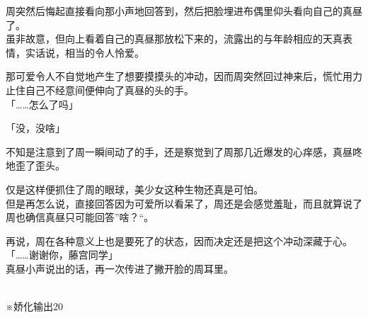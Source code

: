 周突然后悔起直接看向那小声地回答到，然后把脸埋进布偶里仰头看向自己的真昼了。\\

虽非故意，但向上看着自己的真昼那放松下来的，流露出的与年龄相应的天真表情，实话说，相当的令人怜爱。

那可爱令人不自觉地产生了想要摸摸头的冲动，因而周突然回过神来后，慌忙用力止住自己不经意间便伸向了真昼的头的手。\\

「……怎么了吗」

「没，没啥」

不知是注意到了周一瞬间动了的手，还是察觉到了周那几近爆发的心痒感，真昼咚地歪了歪头。

仅是这样便抓住了周的眼球，美少女这种生物还真是可怕。\\

但是再怎么说，直接回答因为可爱所以看呆了，周还是会感觉羞耻，而且就算说了周也确信真昼只可能回答”啥？“。

再说，周在各种意义上也是要死了的状态，因而决定还是把这个冲动深藏于心。\\

「……谢谢你，藤宫同学」\\

真昼小声说出的话，再一次传进了撇开脸的周耳里。

\noindent\makebox[\linewidth]{\rule{\paperwidth}{0.4pt}}
\\

※娇化输出20%
